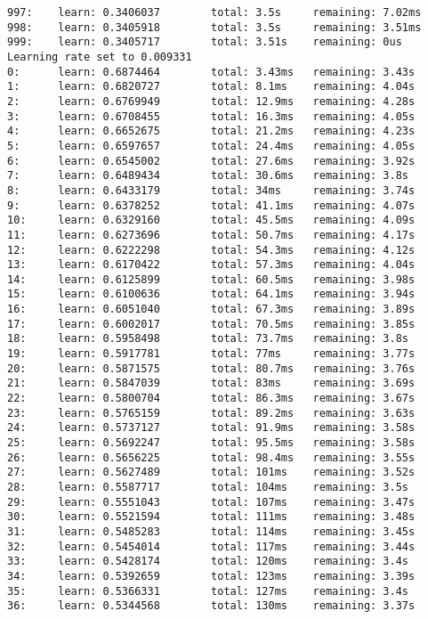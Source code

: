 \documentclass[11pt]{article}
\begin{document}
\begin{Verbatim}[commandchars=\\\{\}]
997:    learn: 0.3406037        total: 3.5s     remaining: 7.02ms
998:    learn: 0.3405918        total: 3.5s     remaining: 3.51ms
999:    learn: 0.3405717        total: 3.51s    remaining: 0us
Learning rate set to 0.009331
0:      learn: 0.6874464        total: 3.43ms   remaining: 3.43s
1:      learn: 0.6820727        total: 8.1ms    remaining: 4.04s
2:      learn: 0.6769949        total: 12.9ms   remaining: 4.28s
3:      learn: 0.6708455        total: 16.3ms   remaining: 4.05s
4:      learn: 0.6652675        total: 21.2ms   remaining: 4.23s
5:      learn: 0.6597657        total: 24.4ms   remaining: 4.05s
6:      learn: 0.6545002        total: 27.6ms   remaining: 3.92s
7:      learn: 0.6489434        total: 30.6ms   remaining: 3.8s
8:      learn: 0.6433179        total: 34ms     remaining: 3.74s
9:      learn: 0.6378252        total: 41.1ms   remaining: 4.07s
10:     learn: 0.6329160        total: 45.5ms   remaining: 4.09s
11:     learn: 0.6273696        total: 50.7ms   remaining: 4.17s
12:     learn: 0.6222298        total: 54.3ms   remaining: 4.12s
13:     learn: 0.6170422        total: 57.3ms   remaining: 4.04s
14:     learn: 0.6125899        total: 60.5ms   remaining: 3.98s
15:     learn: 0.6100636        total: 64.1ms   remaining: 3.94s
16:     learn: 0.6051040        total: 67.3ms   remaining: 3.89s
17:     learn: 0.6002017        total: 70.5ms   remaining: 3.85s
18:     learn: 0.5958498        total: 73.7ms   remaining: 3.8s
19:     learn: 0.5917781        total: 77ms     remaining: 3.77s
20:     learn: 0.5871575        total: 80.7ms   remaining: 3.76s
21:     learn: 0.5847039        total: 83ms     remaining: 3.69s
22:     learn: 0.5800704        total: 86.3ms   remaining: 3.67s
23:     learn: 0.5765159        total: 89.2ms   remaining: 3.63s
24:     learn: 0.5737127        total: 91.9ms   remaining: 3.58s
25:     learn: 0.5692247        total: 95.5ms   remaining: 3.58s
26:     learn: 0.5656225        total: 98.4ms   remaining: 3.55s
27:     learn: 0.5627489        total: 101ms    remaining: 3.52s
28:     learn: 0.5587717        total: 104ms    remaining: 3.5s
29:     learn: 0.5551043        total: 107ms    remaining: 3.47s
30:     learn: 0.5521594        total: 111ms    remaining: 3.48s
31:     learn: 0.5485283        total: 114ms    remaining: 3.45s
32:     learn: 0.5454014        total: 117ms    remaining: 3.44s
33:     learn: 0.5428174        total: 120ms    remaining: 3.4s
34:     learn: 0.5392659        total: 123ms    remaining: 3.39s
35:     learn: 0.5366331        total: 127ms    remaining: 3.4s
36:     learn: 0.5344568        total: 130ms    remaining: 3.37s

\end{Verbatim}
\end{document}
